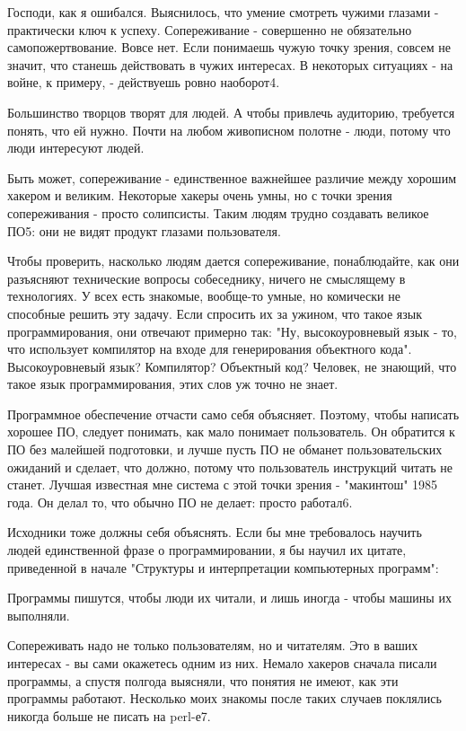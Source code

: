 \documentclass[ebook,12pt,oneside,openany]{memoir}
\begin{document}
Господи, как я ошибался. Выяснилось, что умение смотреть чужими
глазами - практически ключ к успеху. Сопереживание - совершенно не
обязательно самопожертвование. Вовсе нет. Если понимаешь чужую точку
зрения, совсем не значит, что станешь действовать в чужих интересах. В
некоторых ситуациях - на войне, к примеру, - действуешь ровно
наоборот4.

Большинство творцов творят для людей. А чтобы привлечь аудиторию,
требуется понять, что ей нужно. Почти на любом живописном полотне -
люди, потому что люди интересуют людей.

Быть может, сопереживание - единственное важнейшее различие между
хорошим хакером и великим. Некоторые хакеры очень умны, но с точки
зрения сопереживания - просто солипсисты. Таким людям трудно создавать
великое ПО5: они не видят продукт глазами пользователя.

Чтобы проверить, насколько людям дается сопереживание, понаблюдайте,
как они разъясняют технические вопросы собеседнику, ничего не
смыслящему в технологиях. У всех есть знакомые, вообще-то умные, но
комически не способные решить эту задачу. Если спросить их за ужином,
что такое язык программирования, они отвечают примерно так: "Ну,
высокоуровневый язык - то, что использует компилятор на входе для
генерирования объектного кода". Высокоуровневый язык? Компилятор?
Объектный код? Человек, не знающий, что такое язык программирования,
этих слов уж точно не знает.

Программное обеспечение отчасти само себя объясняет. Поэтому, чтобы
написать хорошее ПО, следует понимать, как мало понимает пользователь.
Он обратится к ПО без малейшей подготовки, и лучше пусть ПО не обманет
пользовательских ожиданий и сделает, что должно, потому что
пользователь инструкций читать не станет. Лучшая известная мне система
с этой точки зрения - "макинтош" 1985 года. Он делал то, что обычно ПО
не делает: просто работал6.

Исходники тоже должны себя объяснять. Если бы мне требовалось научить
людей единственной фразе о программировании, я бы научил их цитате,
приведенной в начале "Структуры и интерпретации компьютерных
программ":

Программы пишутся, чтобы люди их читали, и лишь иногда - чтобы машины
их выполняли.

Сопереживать надо не только пользователям, но и читателям. Это в ваших
интересах - вы сами окажетесь одним из них. Немало хакеров сначала
писали программы, а спустя полгода выясняли, что понятия не имеют, как
эти программы работают. Несколько моих знакомы после таких случаев
поклялись никогда больше не писать на perl-е7.
\end{document}
